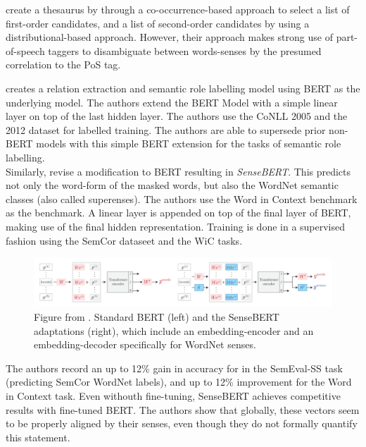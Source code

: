 \documentclass[a4paper,12pt,twoside,openright]{report}
\begin{document}
\cite{liebeskind19} create a thesaurus by through a co-occurrence-based approach to select a list of first-order candidates, and a list of second-order candidates by using a  distributional-based approach.
However, their approach makes strong use of part-of-speech taggers to disambiguate between words-senses by the presumed correlation to the PoS tag.

\cite{shi19} creates a relation extraction and semantic role labelling model using BERT as the underlying model.
The authors extend the BERT Model with a simple linear layer on top of the last hidden layer. 
The authors use the CoNLL 2005 \cite{carreras04} and the 2012  dataset \cite{pradhan13} for labelled training.
The authors are able to supersede prior non-BERT models with this simple BERT extension for the tasks of semantic role labelling. \\

Similarly, \cite{levine19} revise a modification to BERT resulting in \textit{SenseBERT}.
This predicts not only the word-form of the masked words, but also the WordNet semantic classes (also called superenses).
The authors use the Word in Context benchmark as the benchmark.
A linear layer is appended on top of the final layer of BERT, making use of the final hidden representation.
Training is done in a supervised fashion using the SemCor dataseet and the WiC tasks.

\begin{figure}
	\center
  \includegraphics[width=\linewidth]{./assets/relatedwork/sensebert.png}
  \caption{Figure from \cite{levine19}. Standard BERT (left) and the SenseBERT adaptations (right), which include an embedding-encoder and an embedding-decoder specifically for WordNet senses.}
  \label{fig:embeddings_by_language}
\end{figure}

The authors record an up to 12\% gain in accuracy for in the SemEval-SS task (predicting SemCor WordNet labels), and up to 12\% improvement for the Word in Context task.
Even withouth fine-tuning, SenseBERT achieves competitive results with fine-tuned BERT.
The authors show that globally, these vectors seem to be properly aligned by their senses, even though they do not formally quantify this statement. \\
\end{document}

